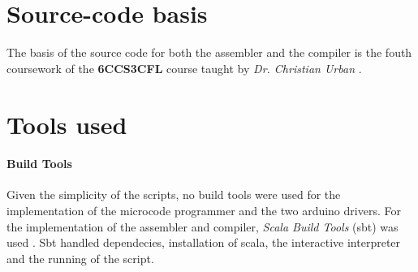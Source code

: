 \section{Source-code basis}
The basis of the source code for both the assembler and the compiler is the fouth coursework
of the \textbf{6CCS3CFL} course taught by \emph{Dr. Christian Urban} \cite{6ccs3cfl}.

\section{Tools used}

\paragraph{Build Tools} Given the simplicity of the scripts, no build tools were used for the
implementation of the microcode programmer and the two arduino drivers. For the implementation
of the assembler and compiler, \emph{Scala Build Tools} (sbt) was used \cite{sbt}. Sbt handled
dependecies, installation of scala, the interactive interpreter and the running of the script.
